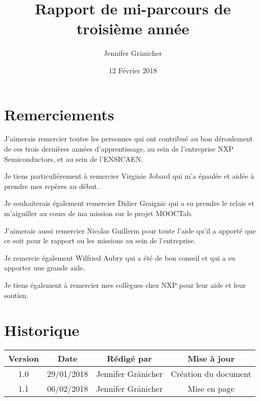 \documentclass[french,12pt,a4paper,titlepage,openright,openbib]{report}
\title{Rapport de mi-parcours de troisième année}
\author{Jennifer Gr\"{a}nicher}
\date{12 Février 2018}
\begin{document}



\maketitle

\chapter*{Remerciements}

J'aimerais remercier toutes les personnes qui ont contribué au bon déroulement de ces trois dernières années d'apprentissage, au sein de l'entreprise NXP Semiconductors, et au sein de l'ENSICAEN.

Je tiens particulièrement à remercier Virginie Jobard qui m'a épaulée et aidée à prendre mes repères au début.

Je souhaiterais également remercier Didier Graignic qui a su prendre le relais et m'aiguiller au cours de ma mission sur le projet MOOCTab.

J'aimerais aussi remercier Nicolas Guillerm pour toute l'aide qu'il a apporté que ce soit pour le rapport ou les missions au sein de l'entreprise.

Je remercie également Wilfried Aubry qui a été de bon conseil et qui a su apporter une grande aide.

Je tiens également à remercier mes collègues chez NXP pour leur aide et leur soutien.


\tableofcontents

\chapter*{Historique}
\begin{table}[ht]
	\label{tab:historique}
	\centering
	\begin{tabular}{|c|c|c|c|}
		\hline
		{\bf Version} & {\bf Date} & {\bf Rédigé par}    & {\bf Mise à jour}    \\
		\hline
		1.0           & 29/01/2018 & Jennifer Gränicher  & Création du document \\
		\hline
		1.1           & 06/02/2018 & Jennifer Gränicher  & Mise en page \\
		\hline
	\end{tabular}
\end{table}

\vspace{2cm}
\end{document}
